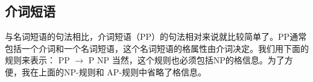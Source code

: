 \subsection{介词短语}
\label{Abschnitt-PP-Syntax}
与名词短语的句法相比，介词短语（PP）的句法相对来说就比较简单了。PP通常包括一个介词和一个名词短语，这个名词短语的格属性由介词决定。我们用下面的规则来表示：
\ea
\label{Regel-PP-einfach}
PP $\to$ P NP
\z
当然，这个规则也必须包括NP的格信息。为了方便，我在上面的NP-规则和 AP-规则中省略了格信息。

